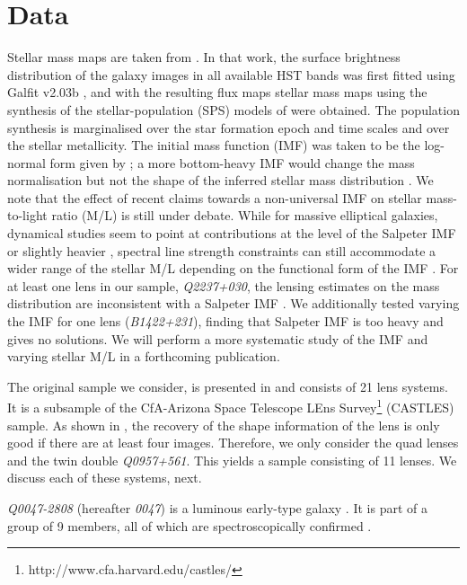 \documentclass[useAMS,usenatbib]{mn2e}
\begin{document}
\section{Data}\label{sec:data}
Stellar mass maps are taken from \cite{2011ApJ...740...97L}. In that work, the surface brightness distribution of the galaxy images in all available HST bands was first fitted using {\sc Galfit v2.03b} \citep{2002AJ....124..266P}, and with the resulting flux maps stellar mass maps using the synthesis of the stellar-population (SPS) models of \cite{2003MNRAS.344.1000B} were obtained. The population synthesis is marginalised over the star formation epoch and time scales and over the stellar metallicity. The initial mass function (IMF) was taken to be the log-normal form given by \cite{2003PASP..115..763C}; a more bottom-heavy IMF would change the mass normalisation \citep[cf.][]{2014ApJ...793...96S} but not the shape of the inferred stellar mass distribution \citep[unless the IMF presents significant intrinsic deviations locally, see e.g.][]{2015MNRAS.447.1033M}. We note that the effect of recent claims towards a non-universal IMF on stellar mass-to-light ratio (M/L) is still under debate. While for massive elliptical galaxies, dynamical studies seem to point at contributions at the level of the Salpeter IMF or slightly heavier \citep{2013MNRAS.432.1862C}, spectral line strength constraints can still accommodate a wider range of the stellar M/L depending on the functional form of the IMF \citep{2013MNRAS.429L..15F}. For at least one lens in our sample, \textit{Q2237+030}, the lensing estimates on the mass distribution are inconsistent with a Salpeter IMF \citep{2010MNRAS.409L..30F}. We additionally tested varying the IMF for one lens ({\it B1422+231}), finding that Salpeter IMF is too heavy and gives no solutions. We will perform a more systematic study of the IMF and varying stellar M/L in a forthcoming publication.

The original sample we consider, is presented in \cite{2011ApJ...740...97L} and consists of 21 lens systems. It is a subsample of the CfA-Arizona Space Telescope LEns Survey\footnote{http://www.cfa.harvard.edu/castles/} (CASTLES) sample. As shown in \cite{2014MNRAS.445.2181C}, the recovery of the shape information of the lens is only good if there are at least four images. Therefore, we only consider the quad lenses and the twin double \textit{Q0957+561}. This yields a sample consisting of 11 lenses. We discuss each of these systems, next.

\textit{Q0047-2808} (hereafter \textit{0047}) is a luminous early-type galaxy \citep{1996MNRAS.278..139W}. It is part of a group of 9 members, all of which are spectroscopically confirmed \citep{2011ApJ...726...84W}.
\end{document}
